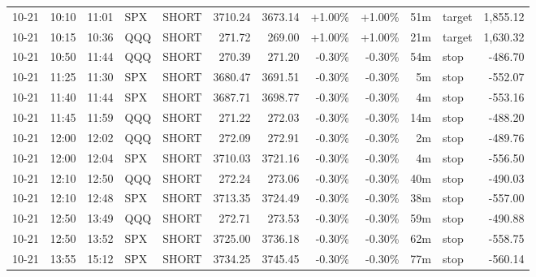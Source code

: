 \documentclass[11pt,a4paper,twoside]{article}
\begin{document}
\begin{center}
\begin{longtable}{>{\color{txtmain}}l l l l l r r r r r >{\color{txtmain}}l r}
10-21 & 10:10 & 11:01 & SPX & SHORT & 3710.24 & 3673.14 & \textcolor{wingreen}{+1.00\%} & \textcolor{wingreen}{+1.00\%} & 51m & target & \textcolor{wingreen}{1,855.12} \\
10-21 & 10:15 & 10:36 & QQQ & SHORT & 271.72 & 269.00 & \textcolor{wingreen}{+1.00\%} & \textcolor{wingreen}{+1.00\%} & 21m & target & \textcolor{wingreen}{1,630.32} \\
10-21 & 10:50 & 11:44 & QQQ & SHORT & 270.39 & 271.20 & \textcolor{lossred}{-0.30\%} & \textcolor{lossred}{-0.30\%} & 54m & stop & \textcolor{lossred}{-486.70} \\
10-21 & 11:25 & 11:30 & SPX & SHORT & 3680.47 & 3691.51 & \textcolor{lossred}{-0.30\%} & \textcolor{lossred}{-0.30\%} & 5m & stop & \textcolor{lossred}{-552.07} \\
10-21 & 11:40 & 11:44 & SPX & SHORT & 3687.71 & 3698.77 & \textcolor{lossred}{-0.30\%} & \textcolor{lossred}{-0.30\%} & 4m & stop & \textcolor{lossred}{-553.16} \\
10-21 & 11:45 & 11:59 & QQQ & SHORT & 271.22 & 272.03 & \textcolor{lossred}{-0.30\%} & \textcolor{lossred}{-0.30\%} & 14m & stop & \textcolor{lossred}{-488.20} \\
10-21 & 12:00 & 12:02 & QQQ & SHORT & 272.09 & 272.91 & \textcolor{lossred}{-0.30\%} & \textcolor{lossred}{-0.30\%} & 2m & stop & \textcolor{lossred}{-489.76} \\
10-21 & 12:00 & 12:04 & SPX & SHORT & 3710.03 & 3721.16 & \textcolor{lossred}{-0.30\%} & \textcolor{lossred}{-0.30\%} & 4m & stop & \textcolor{lossred}{-556.50} \\
10-21 & 12:10 & 12:50 & QQQ & SHORT & 272.24 & 273.06 & \textcolor{lossred}{-0.30\%} & \textcolor{lossred}{-0.30\%} & 40m & stop & \textcolor{lossred}{-490.03} \\
10-21 & 12:10 & 12:48 & SPX & SHORT & 3713.35 & 3724.49 & \textcolor{lossred}{-0.30\%} & \textcolor{lossred}{-0.30\%} & 38m & stop & \textcolor{lossred}{-557.00} \\
10-21 & 12:50 & 13:49 & QQQ & SHORT & 272.71 & 273.53 & \textcolor{lossred}{-0.30\%} & \textcolor{lossred}{-0.30\%} & 59m & stop & \textcolor{lossred}{-490.88} \\
10-21 & 12:50 & 13:52 & SPX & SHORT & 3725.00 & 3736.18 & \textcolor{lossred}{-0.30\%} & \textcolor{lossred}{-0.30\%} & 62m & stop & \textcolor{lossred}{-558.75} \\
10-21 & 13:55 & 15:12 & SPX & SHORT & 3734.25 & 3745.45 & \textcolor{lossred}{-0.30\%} & \textcolor{lossred}{-0.30\%} & 77m & stop & \textcolor{lossred}{-560.14} \\

\end{longtable}
\end{center}
\end{document}
